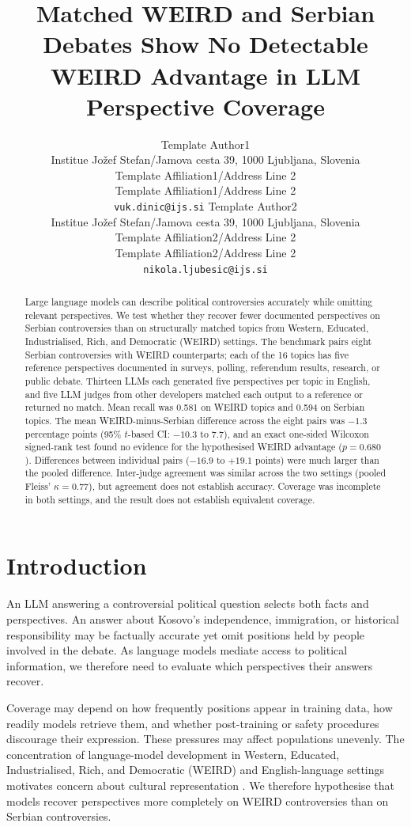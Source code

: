 \documentclass[11pt,a4paper]{article}
\title{Matched WEIRD and Serbian Debates Show No Detectable WEIRD Advantage in LLM Perspective Coverage}
\author{
  Template Author1\Thanks{The {\em actual} contributors to this instruction
    document and corresponding template file are given in Section
    \ref{sec:contributors}.} 
  \\
  Institue Jožef Stefan/Jamova cesta 39, 1000 Ljubljana, Slovenia
  \\
  Template Affiliation1/Address Line 2
  \\
  Template Affiliation1/Address Line 2
  \\
  \texttt{vuk.dinic@ijs.si}
  \And
  Template Author2 
  \\
  Institue Jožef Stefan/Jamova cesta 39, 1000 Ljubljana, Slovenia
  \\
  Template Affiliation2/Address Line 2
  \\
  Template Affiliation2/Address Line 2
  \\
  \texttt{nikola.ljubesic@ijs.si}
}
\date{}
\begin{document}
\maketitle
\begin{abstract}
Large language models can describe political controversies accurately while omitting relevant perspectives. We test whether they recover fewer documented perspectives on Serbian controversies than on structurally matched topics from Western, Educated, Industrialised, Rich, and Democratic (WEIRD) settings. The benchmark pairs eight Serbian controversies with WEIRD counterparts; each of the 16 topics has five reference perspectives documented in surveys, polling, referendum results, research, or public debate. Thirteen LLMs each generated five perspectives per topic in English, and five LLM judges from other developers matched each output to a reference or returned no match. Mean recall was 0.581 on WEIRD topics and 0.594 on Serbian topics. The mean WEIRD-minus-Serbian difference across the eight pairs was $-1.3$ percentage points (95\% $t$-based CI: $-10.3$ to $7.7$), and an exact one-sided Wilcoxon signed-rank test found no evidence for the hypothesised WEIRD advantage ($p=0.680$). Differences between individual pairs ($-16.9$ to $+19.1$ points) were much larger than the pooled difference. Inter-judge agreement was similar across the two settings (pooled Fleiss' $\kappa=0.77$), but agreement does not establish accuracy. Coverage was incomplete in both settings, and the result does not establish equivalent coverage.
\end{abstract}

\section{Introduction}
\label{sec:Introduction}
An LLM answering a controversial political question selects both facts and perspectives. An answer about Kosovo's independence, immigration, or historical responsibility may be factually accurate yet omit positions held by people involved in the debate. As language models mediate access to political information, we therefore need to evaluate which perspectives their answers recover.

Coverage may depend on how frequently positions appear in training data, how readily models retrieve them, and whether post-training or safety procedures discourage their expression. These pressures may affect populations unevenly. The concentration of language-model development in Western, Educated, Industrialised, Rich, and Democratic (WEIRD) \citep{henrich2010weirdest} and English-language settings motivates concern about cultural representation \cite{sorensenRoadmapPluralisticAlignment2024, fengModularPluralismPluralistic2024, wangMultilingualPromptingImproving2025, zewailMoralStereotypingLarge2026}. We therefore hypothesise that models recover perspectives more completely on WEIRD controversies than on Serbian controversies.
\end{document}

